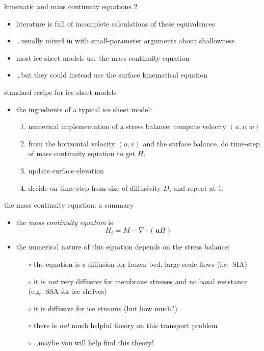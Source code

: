 \begin{frame}{kinematic and mass continuity equations 2}

\begin{itemize}
\item literature is full of incomplete calculations of these equivalences
\item \dots usually mixed in with small-parameter arguments about shallowness
\item most ice sheet models use the mass continuity equation
\item \dots but they could instead use the surface kinematical equation
\end{itemize}
\end{frame}


\begin{frame}{standard recipe for ice sheet models}

\begin{itemize}
\item the ingredients of a typical ice sheet model:
  \begin{enumerate}
  \item numerical implementation of a stress balance: compute velocity $(u,v,w)$
  \item from the horizontal velocity $(u,v)$ and the surface balance, do time-step of mass continuity equation to get $H_t$
  \item update surface elevation
  \item decide on time-step from size of diffusivity $D$, and repeat at 1.
  \end{enumerate}
\end{itemize}
\end{frame}


\begin{frame}{the mass continuity equation: a summary}

\begin{itemize}
\item the \emph{mass continuity equation} is
  $$H_t = M - \nabla \cdot (\mathbf{u} H)$$
\item the numerical nature of this equation depends on the stress balance:
  \begin{itemize}
  \item[$\circ$] the equation is a diffusion for frozen bed, large scale flows (i.e.~SIA)
  \item[$\circ$] it is \emph{not} very diffusive for membrane stresses and no basal resistance (e.g.~SSA for ice shelves)
  \item[$\circ$] it is diffusive for ice streams (but how much?)
  \item[$\circ$] there is \emph{not} much helpful theory on this transport problem
  \item[$\circ$] \dots maybe you will help find this theory!
  \end{itemize}
\end{itemize}
\end{frame}
